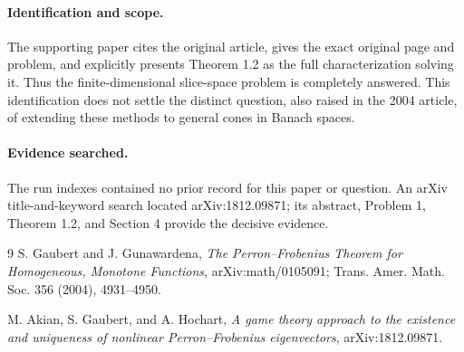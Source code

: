 \documentclass[10pt]{article}
\begin{document}
\paragraph{Identification and scope.}
The supporting paper cites the original article, gives the exact original page and problem, and explicitly presents Theorem 1.2 as the full characterization solving it.  Thus the finite-dimensional slice-space problem is completely answered.  This identification does not settle the distinct question, also raised in the 2004 article, of extending these methods to general cones in Banach spaces.

\paragraph{Evidence searched.}
The run indexes contained no prior record for this paper or question.  An arXiv title-and-keyword search located arXiv:1812.09871; its abstract, Problem 1, Theorem 1.2, and Section 4 provide the decisive evidence.

\begin{thebibliography}{9}
S. Gaubert and J. Gunawardena,
\emph{The Perron--Frobenius Theorem for Homogeneous, Monotone Functions},
arXiv:math/0105091; Trans. Amer. Math. Soc. 356 (2004), 4931--4950.

M. Akian, S. Gaubert, and A. Hochart,
\emph{A game theory approach to the existence and uniqueness of nonlinear Perron--Frobenius eigenvectors},
arXiv:1812.09871.
\end{thebibliography}
\end{document}
